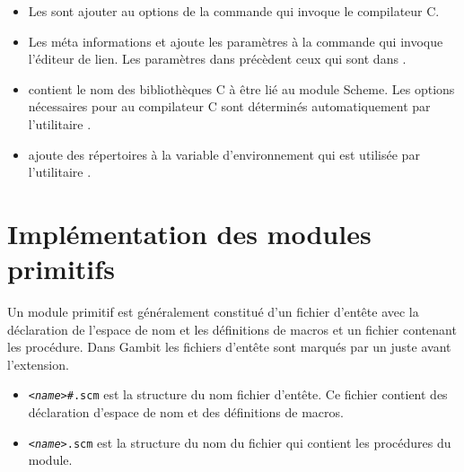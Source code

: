 \begin{itemize}
  \item Les  sont ajouter au options de la commande qui
    invoque le compilateur C.

  \item Les méta informations  et 
    ajoute les paramètres à la commande qui invoque l'éditeur de lien.
    Les paramètres dans  précèdent ceux
    qui sont dans .

  \item {} contient le nom des bibliothèques C à être
    lié au module Scheme. Les options nécessaires pour au compilateur
    C sont déterminés automatiquement par l'utilitaire .

  \item {} ajoute des répertoires à la variable d'environnement
     qui est utilisée par l'utilitaire .

\end{itemize}

\section{Implémentation des modules primitifs}

Un module primitif est généralement constitué d'un fichier d'entête avec la
déclaration de l'espace de nom et les définitions de macros et un fichier
contenant les procédure. Dans Gambit les fichiers d'entête sont marqués par un
\lstcode{#} juste avant l'extension.

\begin{itemize}
  \item \texttt{\textit{<name>}\#.scm} est la structure du nom fichier d'entête.
    Ce fichier contient des déclaration d'espace de nom et des
    définitions de macros.

  \item \texttt{\textit{<name>}.scm} est la structure du nom du fichier qui contient
    les procédures du module.

\end{itemize}

